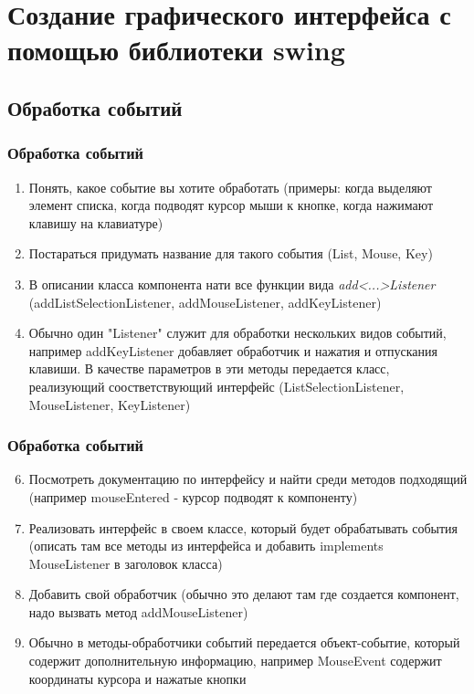 \section{Создание графического интерфейса с помощью библиотеки swing}
\subsection{Обработка событий}


\begin{frame}[fragile]
	\frametitle{Обработка событий}

	\large{}
	\begin{enumerate}
	\item{Понять, какое событие вы хотите обработать (примеры: когда выделяют элемент списка, когда подводят курсор мыши к кнопке, когда нажимают клавишу на клавиатуре)}
	\item{Постараться придумать название для такого события (List, Mouse, Key)}
	\item{В описании класса компонента нати все функции вида \emph{add<...>Listener} (addListSelectionListener, addMouseListener, addKeyListener)}
	\item{Обычно один "Listener" служит для обработки нескольких видов событий, например addKeyListener добавляет обработчик и нажатия и отпускания клавиши. В качестве параметров в эти методы передается класс, реализующий соостветствующий интерфейс (ListSelectionListener, MouseListener, KeyListener)}
	\end{enumerate}
\end{frame}

\begin{frame}[fragile]
	\frametitle{Обработка событий}

	\begin{enumerate}
	\setcounter{enumi}{5}
	\item{Посмотреть документацию по интерфейсу и найти среди методов подходящий (например mouseEntered - курсор подводят к компоненту)}
	\item{Реализовать интерфейс в своем классе, который будет обрабатывать события (описать там все методы из интерфейса и добавить implements MouseListener в заголовок класса)}
	\item{Добавить свой обработчик (обычно это делают там где создается компонент, надо вызвать метод addMouseListener)}
	\item{Обычно в методы-обработчики событий передается объект-событие, который содержит дополнительную информацию, например MouseEvent содержит координаты курсора и нажатые кнопки}
	\end{enumerate}

\end{frame}


